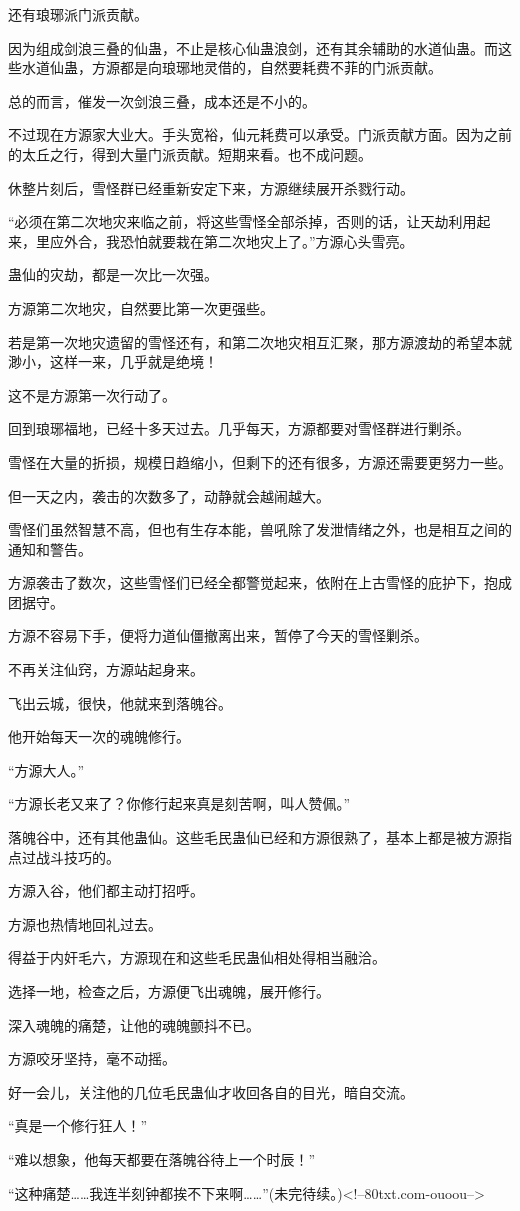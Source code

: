 \begin{this_body}
还有琅琊派门派贡献。

因为组成剑浪三叠的仙蛊，不止是核心仙蛊浪剑，还有其余辅助的水道仙蛊。而这些水道仙蛊，方源都是向琅琊地灵借的，自然要耗费不菲的门派贡献。

总的而言，催发一次剑浪三叠，成本还是不小的。

不过现在方源家大业大。手头宽裕，仙元耗费可以承受。门派贡献方面。因为之前的太丘之行，得到大量门派贡献。短期来看。也不成问题。

休整片刻后，雪怪群已经重新安定下来，方源继续展开杀戮行动。

“必须在第二次地灾来临之前，将这些雪怪全部杀掉，否则的话，让天劫利用起来，里应外合，我恐怕就要栽在第二次地灾上了。”方源心头雪亮。

蛊仙的灾劫，都是一次比一次强。

方源第二次地灾，自然要比第一次更强些。

若是第一次地灾遗留的雪怪还有，和第二次地灾相互汇聚，那方源渡劫的希望本就渺小，这样一来，几乎就是绝境！

这不是方源第一次行动了。

回到琅琊福地，已经十多天过去。几乎每天，方源都要对雪怪群进行剿杀。

雪怪在大量的折损，规模日趋缩小，但剩下的还有很多，方源还需要更努力一些。

但一天之内，袭击的次数多了，动静就会越闹越大。

雪怪们虽然智慧不高，但也有生存本能，兽吼除了发泄情绪之外，也是相互之间的通知和警告。

方源袭击了数次，这些雪怪们已经全都警觉起来，依附在上古雪怪的庇护下，抱成团据守。

方源不容易下手，便将力道仙僵撤离出来，暂停了今天的雪怪剿杀。

不再关注仙窍，方源站起身来。

飞出云城，很快，他就来到落魄谷。

他开始每天一次的魂魄修行。

“方源大人。”

“方源长老又来了？你修行起来真是刻苦啊，叫人赞佩。”

落魄谷中，还有其他蛊仙。这些毛民蛊仙已经和方源很熟了，基本上都是被方源指点过战斗技巧的。

方源入谷，他们都主动打招呼。

方源也热情地回礼过去。

得益于内奸毛六，方源现在和这些毛民蛊仙相处得相当融洽。

选择一地，检查之后，方源便飞出魂魄，展开修行。

深入魂魄的痛楚，让他的魂魄颤抖不已。

方源咬牙坚持，毫不动摇。

好一会儿，关注他的几位毛民蛊仙才收回各自的目光，暗自交流。

“真是一个修行狂人！”

“难以想象，他每天都要在落魄谷待上一个时辰！”

“这种痛楚……我连半刻钟都挨不下来啊……”(未完待续。)<!--80txt.com-ouoou-->

\end{this_body}

